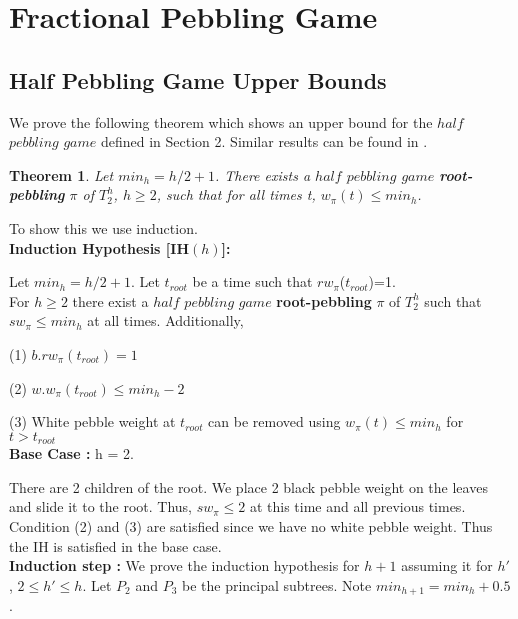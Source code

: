 \documentclass[12pt]{article}
\newtheorem{theorem}{Theorem}[subsection]
\newcommand{\troot}{t_{root}}
\begin{document}
\newpage





\section{Fractional Pebbling Game}

\subsection{Half Pebbling Game Upper Bounds} 

We prove the following theorem which shows an upper bound for the $half$ $pebbling$ $game$ defined in Section 2. Similar results can be found in \cite{c:pebjournal}.

\begin{theorem}
Let $min_h = h/2+1$.
There exists a $half$ $pebbling$ $game$ {\bf root-pebbling} $\pi$ of $T^h_2$, $h \geq 2$, such
that for all times t, $w_\pi(t) \le min_h$.
\end{theorem}

\noindent
To show this we use induction.\\

\noindent
{\bf Induction Hypothesis [IH$(h)$]:} 

\noindent
Let $min_h = h/2 + 1$.  Let $\troot$ be a time such that $rw_\pi$($\troot$)=1.\\
For $h\geq 2$
there exist a $half$ $pebbling$ $game$ {\bf root-pebbling} $\pi$ of $T_2^h$ such that $sw_\pi \leq min_h$ at all times. Additionally,

(1) $b.rw_\pi(\troot) = 1$

(2) $w.w_\pi(\troot) \leq min_h-2$

(3) White pebble weight at $\troot$ can be removed using $w_\pi(t) \leq min_h$ for  $t > \troot$\\

\noindent
{\bf Base Case :} h = 2.

There are 2 children of the root. We place 2 black pebble weight on the leaves and slide it to the root. Thus, $sw_\pi \leq 2$ at this time and all previous times. Condition (2) and (3) are satisfied since we have no white pebble weight. Thus the IH is satisfied in the base case.\\

\noindent
{\bf Induction step :} We prove the induction hypothesis for $h+1$ assuming it for $h'$,
$2\le h' \le h$. Let $P_2$ and $P_3$ be the principal subtrees. Note $min_{h+1} = min_h + 0.5$.\\
\end{document}
